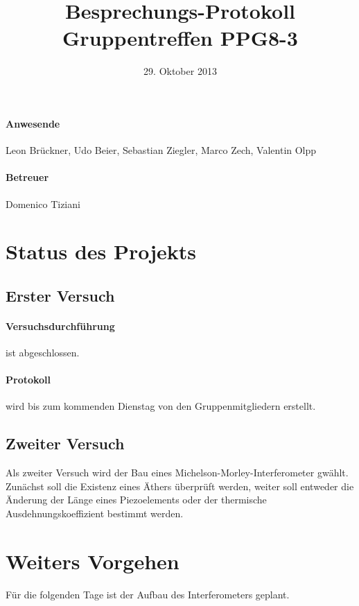 \documentclass[
]{scrartcl}
\begin{document}
\title{Besprechungs-Protokoll Gruppentreffen PPG8-3}
\date{29. Oktober 2013}
\maketitle



\paragraph*{Anwesende}
Leon Brückner,
Udo Beier,
Sebastian Ziegler,
Marco Zech,
Valentin Olpp
\paragraph*{Betreuer}
Domenico Tiziani

\section{Status des Projekts}
\subsection{Erster Versuch}
\paragraph{Versuchsdurchführung} ist abgeschlossen.
\paragraph{Protokoll} wird bis zum kommenden Dienstag von den Gruppenmitgliedern erstellt.
\subsection{Zweiter Versuch}
Als zweiter Versuch wird der Bau eines Michelson-Morley-Interferometer gwählt. Zunächst soll die Existenz eines Äthers überprüft werden, weiter soll entweder die Änderung der Länge eines Piezoelements oder der thermische Ausdehnungskoeffizient bestimmt werden. 
\section{Weiters Vorgehen}
Für die folgenden Tage ist der Aufbau des Interferometers geplant.
\end{document}
